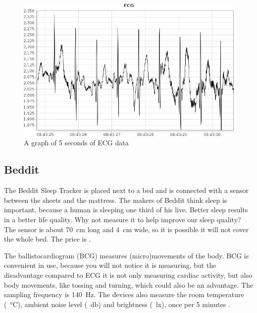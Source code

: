 			\begin{figure}[h]
				\centering
					\includegraphics[scale=0.5]{ecg.png}
					
				\caption{A graph of 5 seconds of ECG data}
				\label{fig:ecg}

			\end{figure}
			


	\subsection{Beddit}
		The Beddit Sleep Tracker is placed next to a bed and is connected with a sensor between the sheets and the mattress. The makers of Beddit think sleep is important, because a human is sleeping one third of his live. Better sleep results in a better life quality. Why not measure it to help improve our sleep quality? The sensor is about \SI{70}{\centi\metre} long and \SI{4}{\centi\metre} wide, so it is possible it will not cover the whole bed. 
			The price is .

			The ballistocardiogram (BCG) measures (micro)movements of the body. \cite{beddit}
			BCG is convenient in use, because you will not notice it is measuring, but the disadvantage compared to ECG it is not only measuring cardiac activity, but also body movements, like tossing and turning, which could also be an advantage. \cite{bcg} The sampling frequency is \SI{140}{\hertz}. The devices also measure the room temperature (\SI{}{\celsius}), ambient noise level (\SI{}{\decibel}) and brightness (\SI{}{\lux}), once per 5 minutes \cite{bedditapi}.

